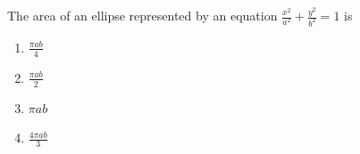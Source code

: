 \item The area of an ellipse represented by an equation $\frac{x^2}{a^2} + \frac{y^2}{b^2} = 1$ is
\begin{multicols}{2}
    \begin{enumerate}
        \item $\frac{\pi a b}{4}$
        \item $\frac{\pi a b}{2}$
        \item $\pi a b$
        \item $\frac{4 \pi a b}{3}$
    \end{enumerate}
\end{multicols}

